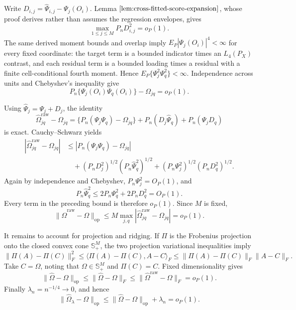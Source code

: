 Write \(D_{i,j}=\widehat\Psi_{i,j}-\Psi_j(O_i)\). Lemma \(\ref{lem:cross-fitted-score-expansion}\), whose proof derives rather than assumes the regression envelopes, gives
\[
 \max_{1\le j\le M}P_nD_{i,j}^2=o_P(1).
\]
The same derived moment bounds and overlap imply \(E_P|\Psi_j(O_i)|^4<\infty\) for every fixed coordinate: the target term is a bounded indicator times an \(L_4(P_X)\) contrast, and each residual term is a bounded loading times a residual with a finite cell-conditional fourth moment. Hence \(E_P\{\Psi_j^2\Psi_q^2\}<\infty\). Independence across units and Chebyshev's inequality give
\[
 P_n\{\Psi_j(O_i)\Psi_q(O_i)\}-\Omega_{jq}=o_P(1).
\]

Using \(\widehat\Psi_j=\Psi_j+D_j\), the identity
\[
 \widehat\Omega^{\mathrm{raw}}_{jq}-\Omega_{jq}
 =\{P_n(\Psi_j\Psi_q)-\Omega_{jq}\}
  +P_n(D_j\widehat\Psi_q)+P_n(\Psi_jD_q)
\]
is exact. Cauchy--Schwarz yields
\[
\begin{aligned}
 |\widehat\Omega^{\mathrm{raw}}_{jq}-\Omega_{jq}|
 &\le |P_n(\Psi_j\Psi_q)-\Omega_{jq}|\\
 &\quad +(P_nD_j^2)^{1/2}(P_n\widehat\Psi_q^2)^{1/2}
 +(P_n\Psi_j^2)^{1/2}(P_nD_q^2)^{1/2}.
\end{aligned}
\]
Again by independence and Chebyshev, \(P_n\Psi_j^2=O_P(1)\), and
\[
 P_n\widehat\Psi_q^2\le2P_n\Psi_q^2+2P_nD_q^2=O_P(1).
\]
Every term in the preceding bound is therefore \(o_P(1)\). Since \(M\) is fixed,
\[
 \|\widehat\Omega^{\mathrm{raw}}-\Omega\|_{\mathrm{op}}
 \le M\max_{j,q}|\widehat\Omega^{\mathrm{raw}}_{jq}-\Omega_{jq}|=o_P(1).
\]

It remains to account for projection and ridging. If \(\Pi\) is the Frobenius projection onto the closed convex cone \(\mathbb S_+^M\), the two projection variational inequalities imply
\[
 \|\Pi(A)-\Pi(C)\|_F^2
 \le\langle\Pi(A)-\Pi(C),A-C\rangle_F
 \le\|\Pi(A)-\Pi(C)\|_F\|A-C\|_F.
\]
Take \(C=\Omega\), noting that \(\Omega\in\mathbb S_+^M\) and \(\Pi(C)=C\). Fixed dimensionality gives
\[
 \|\widehat\Omega-\Omega\|_{\mathrm{op}}
 \le\|\widehat\Omega-\Omega\|_F
 \le\|\widehat\Omega^{\mathrm{raw}}-\Omega\|_F=o_P(1).
\]
Finally \(\lambda_n=n^{-1/4}\to0\), and hence
\[
 \|\widehat\Omega_\lambda-\Omega\|_{\mathrm{op}}
 \le\|\widehat\Omega-\Omega\|_{\mathrm{op}}+\lambda_n=o_P(1).
\]